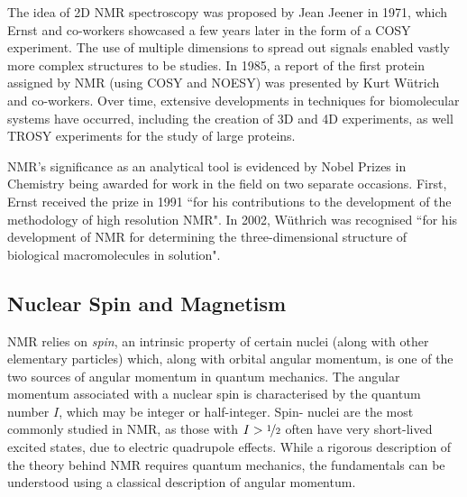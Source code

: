 The idea of 2D NMR spectroscopy was proposed by Jean Jeener in
1971\cite{Jeener1971, Jeener2016}, which Ernst and co-workers showcased a few
years later in the form of a \ac{COSY} experiment\cite{Aue1976a}. The use of
multiple dimensions to spread out signals enabled vastly more complex
structures to be studies. In 1985, a report of the first protein assigned by
\ac{NMR} (using \ac{COSY} and \ac{NOESY}) was presented by Kurt W\"utrich and
co-workers\cite{Williamson1985}. Over time, extensive developments in
techniques for biomolecular systems have occurred, including the creation of 3D
and 4D experiments\cite{Marion1989, Kay1990}, as well \ac{TROSY}
experiments\cite{Pervushin1997} for the study of large proteins.

\ac{NMR}'s significance as an analytical tool is evidenced by Nobel Prizes in
Chemistry being awarded for work in the field on two separate occasions. First,
Ernst received the prize in 1991 ``for his contributions to the development of
the methodology of high resolution \acl{NMR}"\cite{Ernst1992}. In 2002,
W\"uthrich was recognised ``for his development of \acl{NMR} for determining
the three-dimensional structure of biological macromolecules in
solution"\cite{Wuthrich2003}.

\subsection{Nuclear Spin and Magnetism}
\ac{NMR} relies on \textit{spin}, an intrinsic property of certain nuclei
(along with other elementary particles) which, along with orbital angular
momentum, is one of the two sources of angular momentum in quantum mechanics.
The angular momentum associated with a nuclear spin is characterised by the
quantum number $I$, which may be integer or half-integer. Spin-
nuclei are the most commonly studied in \ac{NMR}, as those with $I >
\nicefrac{1}{2}$ often have very short-lived excited states, due to electric
quadrupole effects. While a rigorous description of  the theory behind \ac{NMR}
requires quantum mechanics\cite{Abragam1961,Goldman1988,Cavanagh2007}, the
fundamentals can be understood using a classical description of angular
momentum.

